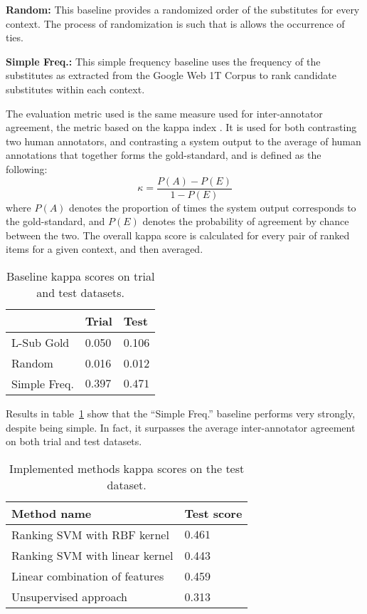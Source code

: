 \documentclass[10pt, a4paper]{article}
\begin{document}
\textbf{Random:} This baseline provides a randomized order of the substitutes for every context. The process of randomization is such that is allows the occurrence of ties.

\textbf{Simple Freq.:} This simple frequency baseline uses the frequency of the substitutes as extracted from the Google Web 1T Corpus \citep{brants2006web} to rank candidate substitutes within each context.
 
 The evaluation metric used is the same measure used for inter-annotator agreement, the metric based on the kappa index \citep{kohen1960coefficient}. It is used for both contrasting two human annotators, and contrasting a system output to the average of human annotations that together forms the gold-standard, and is defined as the following:
\[ \kappa = \frac{P(A) - P(E)}{1 - P(E)} \]
where $P(A)$ denotes the proportion of times the system output corresponds to the gold-standard, and $P(E)$ denotes the probability of agreement by chance between the two. The overall kappa score is calculated for every pair of ranked items for a given context, and then averaged.

\begin{table}
\caption{Baseline kappa scores on trial and test datasets.}
\label{tab:baseline}
\begin{center}
\begin{tabular}{lll}
\toprule
& Trial & Test \\
\midrule
L-Sub Gold & 0.050 & 0.106 \\
Random & 0.016 & 0.012 \\
Simple Freq. & $\mathbf{0.397}$ & $\mathbf{0.471}$ \\
\bottomrule
\end{tabular}
\end{center}
\end{table}

Results in table~\ref{tab:baseline} show that the “Simple Freq.” baseline performs very strongly, despite being simple. In fact, it surpasses the average inter-annotator agreement on both trial and test datasets.

\begin{table}
\caption{Implemented methods kappa scores on the test dataset.}
\label{tab:res}
\begin{center}
\begin{tabular}{ll}
\toprule
Method name & Test score \\
\midrule
Ranking SVM with RBF kernel & $\mathbf{0.461}$ \\
Ranking SVM with linear kernel & 0.443 \\
Linear combination of features & 0.459 \\
Unsupervised approach & 0.313 \\
\bottomrule
\end{tabular}
\end{center}
\end{table}
\end{document}
